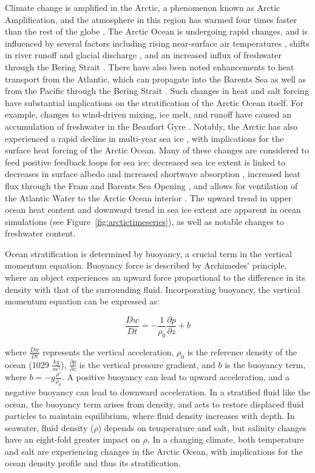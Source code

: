\documentclass[a4paper,12pt]{article}
\begin{document}
        Climate change is amplified in the Arctic, a phenomenon known as Arctic Amplification, and the atmosphere in this region has warmed four times faster than the rest of the globe \cite{Rantanen2022}. The Arctic Ocean is undergoing rapid changes, and is influenced by several factors including rising near-surface air temperatures \cite{Screen2010}, shifts in river runoff and glacial discharge \cite{Proshutinsky2020,Nummelin2015}, and an increased influx of freshwater through the Bering Strait \cite{Woodgate2018,Woodgate2021}. There have also been noted enhancements to heat transport from the Atlantic, which can propagate into the Barents Sea \cite{Hakkinen2009} as well as from the Pacific through the Bering Strait \cite{Woodgate2018,Woodgate2021,Li2024}. Such changes in heat and salt forcing have substantial implications on the stratification of the Arctic Ocean itself. For example, changes to wind-driven mixing, ice melt, and runoff have caused an accumulation of freshwater in the Beaufort Gyre \cite{Proshutinsky2002,Proshutinsky2020,Giles2012}. Notably, the Arctic has also experienced a rapid decline in multi-year sea ice \cite{Perovich2009}, with implications for the surface heat forcing of the Arctic Ocean. Many of these changes are considered to feed positive feedback loops for sea ice: decreased sea ice extent is linked to decreases in surface albedo and increased shortwave absorption \cite{Timmermans2018,Pistone2019}, increased heat flux through the Fram and Barents Sea Opening \cite{Lind2018,Wang2020}, and allows for ventilation of the Atlantic Water to the Arctic Ocean interior \cite{Polyakov2017}. The upward trend in upper ocean heat content and downward trend in sea ice extent are apparent in ocean simulations (see Figure~\ref{fig:arctictimeseries}), as well as notable changes to freshwater content.

        Ocean stratification is determined by buoyancy, a crucial term in the vertical momentum equation. Buoyancy force is described by Archimedes' principle, where an object experiences an upward force proportional to the difference in its density with that of the surrounding fluid. Incorporating buoyancy, the vertical momentum equation can be expressed as:

        $$
        \frac{Dw}{Dt} = -\frac{1}{\rho_0} \frac{\partial p}{\partial z} + b
        $$

        where $\frac{Dw}{Dt}$ represents the vertical acceleration, ${\rho_0}$ is the reference density of the ocean (1029 $\frac{kg}{m^3}$), $\frac{\partial p}{\partial z}$ is the vertical pressure gradient, and $b$ is the buoyancy term, where $b = -g \frac{\rho'}{\rho_0}$. A positive buoyancy can lead to upward acceleration, and a negative buoyancy can lead to downward acceleration. In a stratified fluid like the ocean, the buoyancy term arises from density, and acts to restore displaced fluid particles to maintain equilibrium, where fluid density increases with depth. In seawater, fluid density ($\rho$) depends on temperature and salt, but salinity changes have an eight-fold greater impact on $\rho$. In a changing climate, both temperature and salt are experiencing changes in the Arctic Ocean, with implications for the ocean density profile and thus its stratification.
\end{document}
